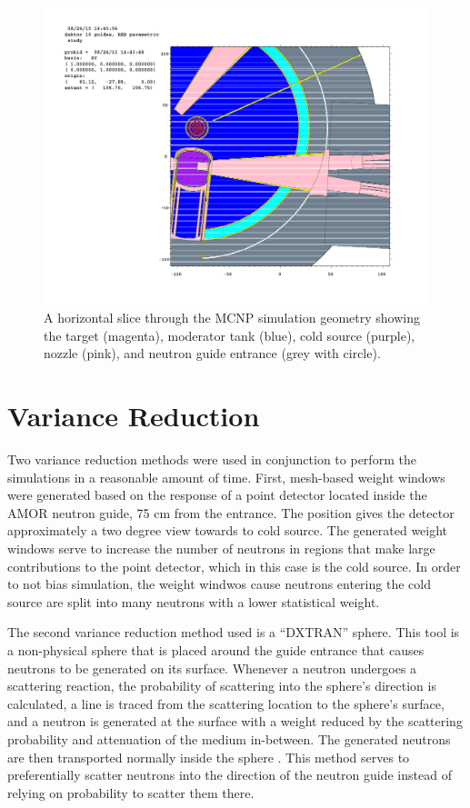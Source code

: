 \documentclass[a4paper]{jpconf}
\begin{document}
\begin{figure}
\begin{center}
\includegraphics[trim={9.2cm 8cm 4cm 8cm},clip]{graphics/geom.pdf}
\end{center}
\caption{\label{geom}A horizontal slice through the MCNP simulation geometry showing the target (magenta), moderator tank (blue), cold source (purple), nozzle (pink), and neutron guide entrance (grey with circle).}
\end{figure}

\section{Variance Reduction}

Two variance reduction methods were used in conjunction to perform the simulations in a reasonable amount of time.  First, mesh-based weight windows were generated based on the response of a point detector located inside the AMOR neutron guide, 75 cm from the entrance.  The position gives the detector approximately a two degree view towards to cold source.  The generated weight windows serve to increase the number of neutrons in regions that make large contributions to the point detector, which in this case is the cold source. In order to not bias simulation, the weight windwos cause neutrons entering the cold source are split into many neutrons with a lower statistical weight.  

The second variance reduction method used is a ``DXTRAN'' sphere.  This tool is a non-physical sphere that is placed around the guide entrance that causes neutrons to be generated on its surface.  Whenever a neutron undergoes a scattering reaction, the probability of scattering into the sphere's direction is calculated, a line is traced from the scattering location to the sphere's surface, and a neutron is generated at the surface with a weight reduced by the scattering probability and attenuation of the medium in-between.  The generated neutrons are then transported normally inside the sphere \cite{mcnp5,mcnp6}.  This method serves to preferentially scatter neutrons into the direction of the neutron guide instead of relying on probability to scatter them there.
\end{document}

